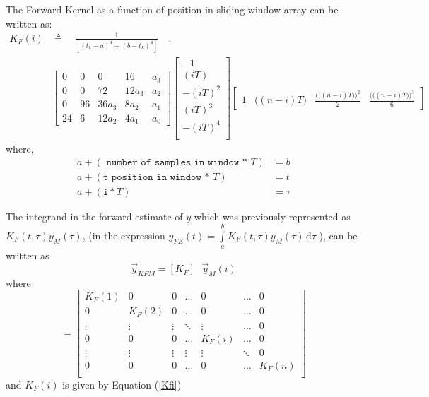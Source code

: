 \documentclass[letterpaper%
, twoside%
, 12pt%
,memoire%
, english%
,creativecommons,hyperref%
]{thETS}
\begin{document}
The Forward Kernel as a function of position in sliding window array can be written as:
\begin{align}
K_{F}(i)  &\triangleq \quad \frac{1}{[(t_k-a)^4+(b-t_k)^4]} \quad .\nonumber\\
&\begin{bmatrix}
0  &  0  &   0   &  16    &   a_3   \\
0  &  0  &   72   & 12a_3  &   a_2  \\
0  &  96 & 36a_3 &  8a_2  &   a_1   \\
24 &  6  & 12a_2 &  4a_1   &   a_0  
\end{bmatrix}
\begin{bmatrix}
  -1     \\
 (iT)    \\
-(iT)^2  \\
 (iT)^3  \\
-(iT)^4  \\
\end{bmatrix}
\begin{bmatrix}
1  & \big((n-i)T\big) & \frac{\Big(\big((n-i)T\big)\Big)^2}{2} & \frac{\Big(\big((n-i)T\big)\Big)^3}{6}
\end{bmatrix}
\label{Kfi}
\end{align}
where,
\begin{subequations}
\begin{align}
a+ (\texttt{ number of samples in window * } T)&= b \\ 
a+ (\texttt{t position in window * } T) &= t \\
a+ (\texttt{i}*T) &= \tau
\end{align}
\end{subequations}

The integrand in the forward estimate of $y$ which was previously represented as
$K_F(t,\tau) y_M(\tau)$, 
(in the expression $y_{FE}(t) =\int\limits_{a}^{b}K_F(t,\tau) y_M(\tau)\, \mathrm{d}\tau $ ), 
can be written as 
$$ \vec{y}_{KFM} = [K_F] \textrm{ } \vec{y}_M(i)$$
where 
\begin{equation*}
[K_F] =
\begin{bmatrix}
    K_F(1) &    0   &   0    & \dots  &    0    & \dots  &   0 \\
      0    & K_F(2) &   0    & \dots  &    0    & \dots  &   0 \\
    \vdots & \vdots & \vdots & \ddots & \vdots  & \dots  &   0 \\
      0    &   0    &   0    & \dots  &  K_F(i) & \dots  &   0 \\ 
    \vdots & \vdots & \vdots & \vdots & \vdots  & \ddots &   0 \\
      0    &   0    &   0    & \dots  &    0    & \dots  &   K_F(n) \\
\end{bmatrix}
\end{equation*}
and $K_F(i)$ is given by Equation (\ref{Kfi})
\end{document}
